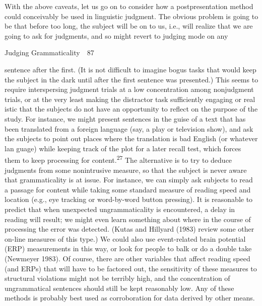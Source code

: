 \begin{styleStandard}
With the above caveats, let us go on to consider how a postpresentation method could conceivably be used in linguistic judgment. The obvious problem is going to be that before too long, the subject will be on to us, i.e., will realize that we are going to ask for judgments, and so might revert to {\textquotedbl}judging mode{\textquotedbl} on any
\end{styleStandard}


\clearpage\setcounter{page}{1}\begin{styleStandard}
Judging Grammaticality\ \ 87
\end{styleStandard}


\begin{styleTextbody}
sentence after the first. (It is not difficult to imagine bogus tasks that would keep the subject in the dark until after the first sentence was presented.) This seems to require interspersing judgment trials at a low concentration among nonjudgment trials, or at the very least making the distractor task sufficiently engaging or real\- istic that the subjects do not have an opportunity to reflect on the purpose of the study. For instance, we might present sentences in the guise of a text that has been translated from a foreign language (say, a play or television show), and ask the subjects to point out places where the translation is bad English (or whatever lan\- guage) while keeping track of the plot for a later recall test, which forces them to keep processing for content.\textsuperscript{27}\textsuperscript{ }The alternative is to try to deduce judgments from some nonintrusive measure, so that the subject is never aware that grammaticality is at issue. For instance, we can simply ask subjects to read a passage for content while taking some standard measure of reading speed and location (e.g., eye tracking or word-by-word button pressing). It is reasonable to predict that when unexpected ungrammaticality is encountered, a delay in reading will result; we might even learn something about where in the course of processing the error was detected. (Kutas and Hillyard (1983) review some other on-line measures of this type.) We could also use event-related brain potential (ERP) measurements in this way, or look for people to balk or do a double take (Newmeyer 1983). Of course, there are other variables that affect reading speed (and ERPs) that will have to be factored out, the sensitivity of these measures to structural violations might not be terribly high, and the concentration of ungrammatical sentences should still be kept reasonably low. Any of these methods is probably best used as corroboration for data derived by other means.
\end{styleTextbody}


